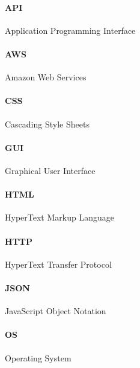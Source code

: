 \paragraph{API}  Application Programming Interface
\paragraph{AWS}  Amazon Web Services
\paragraph{CSS}  Cascading Style Sheets
\paragraph{GUI}  Graphical User Interface
\paragraph{HTML} HyperText Markup Language
\paragraph{HTTP} HyperText Transfer Protocol
\paragraph{JSON} JavaScript Object Notation
\paragraph{OS}   Operating System

